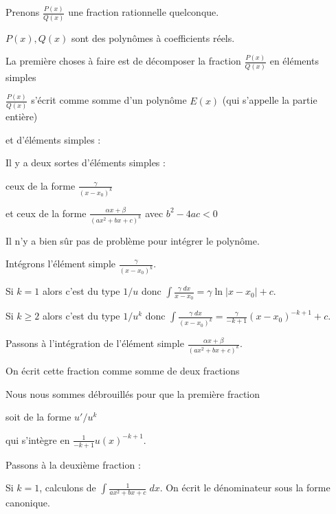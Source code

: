 Prenons  $\frac{P(x)}{Q(x)}$ une fraction rationnelle quelconque.

$P(x),Q(x)$ sont des polynômes à coefficients réels.

La première choses à faire est de décomposer la fraction $\frac{P(x)}{Q(x)}$ en éléments simples 

\change

$\frac{P(x)}{Q(x)}$ 
s'écrit comme somme d'un polynôme $E(x)$ (qui s'appelle la partie entière)

\change

et d'éléments simples :

Il y a deux sortes d'éléments simples :

\change

ceux de la forme $\frac{\gamma}{(x - x_0)^k}$

\change

et ceux de la forme  $\frac{\alpha x+\beta}{(a x^2+b x+c)^k}$
avec $b^2-4ac < 0$

Il n'y a bien sûr pas de problème pour intégrer le polynôme.


\change

Intégrons l'élément simple $\frac{\gamma}{(x - x_0)^k}$.

\change

Si $k=1$ alors c'est du type $1/u$ donc $\int \frac{\gamma \; dx}{x - x_0} = \gamma \ln|x - x_0|+c$.

\change

Si $k\ge 2$ alors c'est du type $1/u^k$ donc  $\int \frac{\gamma \; dx}{(x - x_0)^k} = 
\frac{\gamma}{-k+1}(x - x_0)^{-k+1}+c$. 


\change

Passons à l'intégration de l'élément simple $\frac{\alpha x+\beta}{(a x^2+b x+c)^k}$.

\change

On écrit cette fraction comme somme de deux fractions 

\change

Nous nous sommes débrouillés pour que la première fraction 

\change

soit de la forme $u'/u^k$

\change

qui s'intègre en $\frac{1}{-k+1}u(x)^{-k+1}$.

\change

\change

Passons à la deuxième fraction :

Si $k=1$, calculons de $\int \frac{1}{a x^2+b x+c}\; dx$. On écrit le dénominateur sous la forme canonique. 

